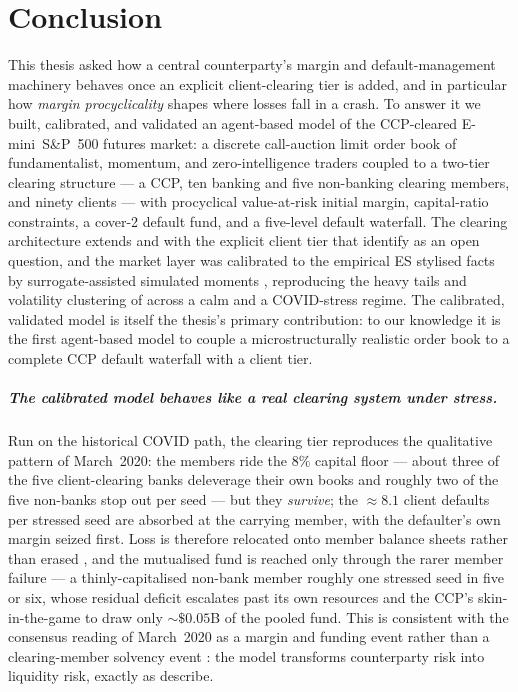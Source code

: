 \chapter{Conclusion}\label{ch:conclusion}

This thesis asked how a central counterparty's margin and default-management machinery behaves once an
explicit client-clearing tier is added, and in particular how \emph{margin procyclicality} shapes where
losses fall in a crash. To answer it we built,
calibrated, and validated an agent-based model of the CCP-cleared E-mini~S\&P~500 futures market: a
discrete call-auction limit order book of fundamentalist, momentum, and zero-intelligence traders
\citep{chiarella_iori_perello_2009, farmer_2005, cont_stoikov_talreja_2008} coupled to a two-tier clearing
structure --- a CCP, ten banking and five non-banking clearing members, and ninety clients --- with
procyclical value-at-risk initial margin, capital-ratio constraints, a cover-2 default fund, and a
five-level default waterfall. The clearing architecture extends \citet{deloitte_ccp} and
\citet{simudyne_odd} with the explicit client tier that \citet{menkveld_vuillemey_2021} identify as an open
question, and the market layer was calibrated to the empirical ES stylised facts by surrogate-assisted
simulated moments \citep{franke_westerhoff_2012, lamperti_2018, gao_2022_hfabm}, reproducing the heavy tails
and volatility clustering of \citet{cont_2001} across a calm and a COVID-stress regime. The calibrated,
validated model is itself the thesis's primary contribution: to our knowledge it is the first agent-based
model to couple a microstructurally realistic order book to a complete CCP default waterfall with a client
tier.

\paragraph{The calibrated model behaves like a real clearing system under stress.}
Run on the historical COVID path, the clearing tier reproduces the qualitative pattern of March~2020: the
members ride the $8\%$ capital floor --- about three of the five client-clearing banks deleverage their own
books and roughly two of the five non-banks stop out per seed --- but they \emph{survive}; the $\approx 8.1$
client defaults per stressed seed are absorbed at the carrying member, with the defaulter's own margin
seized first. Loss is therefore relocated onto member balance sheets rather than erased
\citep{galbiati_soramaki_2013}, and the mutualised fund is reached only through the rarer member failure ---
a thinly-capitalised non-bank member roughly one stressed seed in five or six, whose residual deficit escalates
past its own resources and the CCP's skin-in-the-game to draw only $\sim\$0.05$B of the pooled fund. This is
consistent with the consensus reading of March~2020 as a margin and funding event rather than a
clearing-member solvency event \citep{esrb_2020, cont_2017}: the model transforms counterparty risk into
liquidity risk, exactly as \citet{cont_2017} describe.

